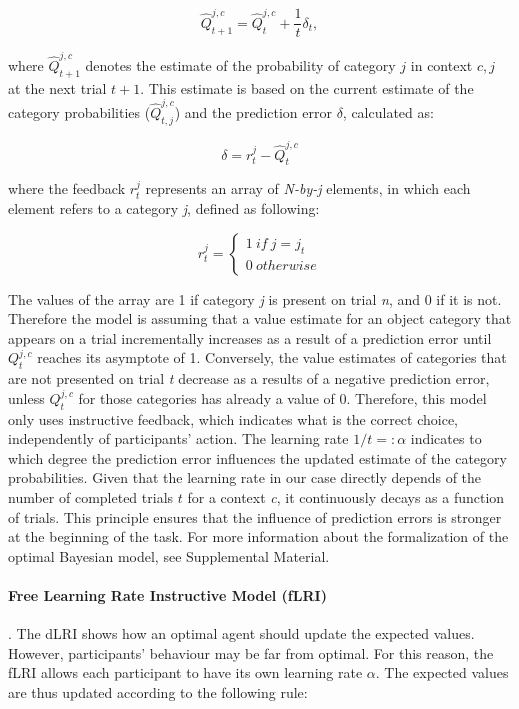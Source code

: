 \documentclass[a4paper,12pt]{article}
\begin{document}
\begin{equation}
\hat{Q}_{t+1}^{j,c} = \hat{Q}_{t}^{j,c}  + \dfrac{1}{t} \delta_{t},
\end{equation}


\noindent
where $\hat{Q}_{t+1}^{j,c}$ denotes the estimate of the probability of category $j$ in context ${c,j}$ at the next trial $t+1$. This estimate is based on the current estimate of the category probabilities ($\hat{Q}_{t,j}^{j, c}$) and the prediction error $\delta$, calculated as:

\begin{equation}
{\delta} = {r}_t^{j} - \hat{Q}_{t}^{j,c}
\label{eq:PE}
\end{equation}

\noindent
where the feedback ${r}_t^{j}$ represents an array of \textit{N-by-j} elements, in which each element refers to a category \textit{j}, defined as following:

\begin{equation}
r_t^j = \begin{cases}
1\ if  \ j = j_t  \\ 
0 \ otherwise
\end{cases}
\label{eq:instrPE}
\end{equation}

\noindent
 The values of the array are 1 if category \textit{j} is present on trial \textit{n}, and 0 if it is not. Therefore the model is assuming that a value estimate for an object category that appears on a trial incrementally increases as a result of a prediction error until $Q_{t}^{j,c}$ reaches its asymptote of 1. Conversely, the value estimates of categories that are not presented on trial \textit{t} decrease as a results of a negative prediction error, unless $Q_{t}^{j,c}$ for those categories has already a value of 0. 
Therefore, this model only uses instructive feedback, which indicates what is the correct choice, independently of participants' action. The learning rate $1/t =: \alpha$ indicates to which degree the prediction error influences the updated estimate of the category probabilities. Given that the learning rate in our case directly depends of the number of completed trials $t$ for a context \textit{c}, it continuously decays as a function of trials. This principle ensures that the influence of prediction errors is stronger at the beginning of the task. For more information about the formalization of the optimal Bayesian model, see Supplemental Material. 

\paragraph{Free Learning Rate Instructive Model (fLRI)}. The dLRI shows how an optimal agent should update the expected values. However, participants' behaviour may be far from optimal. %
For this reason, the fLRI allows each participant to have its own learning rate $\alpha$. The expected values are thus updated according to the following rule: 
\end{document}
